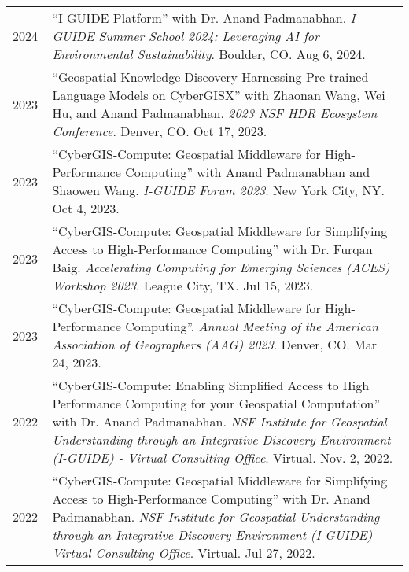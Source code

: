\documentclass{acmcv}
\begin{document}
    \begin{longtable}{p{0.1\linewidth} p{0.9\linewidth}}

        2024 & ``I-GUIDE Platform'' with Dr. Anand Padmanabhan. \textit{I-GUIDE Summer School 2024: Leveraging AI for Environmental Sustainability}. Boulder, CO. Aug 6, 2024.\\


        2023 & ``Geospatial Knowledge Discovery Harnessing Pre-trained Language Models on CyberGISX'' with Zhaonan Wang, Wei Hu, and Anand Padmanabhan. \textit{2023 NSF HDR Ecosystem Conference}. Denver, CO. Oct 17, 2023.\\

        2023 & ``CyberGIS-Compute: Geospatial Middleware for High-Performance Computing'' with Anand Padmanabhan and Shaowen Wang. \textit{I-GUIDE Forum 2023}. New York City, NY. Oct 4, 2023.\\

        2023 & ``CyberGIS-Compute: Geospatial Middleware for Simplifying Access to High-Performance Computing'' with Dr. Furqan Baig. \textit{Accelerating Computing for Emerging Sciences (ACES) Workshop 2023}. League City, TX. Jul 15, 2023.\\

        2023 & ``CyberGIS-Compute: Geospatial Middleware for High-Performance Computing''. \textit{Annual Meeting of the American Association of Geographers (AAG) 2023}. Denver, CO. Mar 24, 2023.\\

        2022 & ``CyberGIS-Compute: Enabling Simplified Access to High Performance Computing for your Geospatial Computation'' with Dr. Anand Padmanabhan. \textit{NSF Institute for Geospatial Understanding through an Integrative Discovery Environment (I-GUIDE) - Virtual Consulting Office}. Virtual. Nov. 2, 2022.\\

        2022 & ``CyberGIS-Compute: Geospatial Middleware for Simplifying Access to High-Performance Computing'' with Dr. Anand Padmanabhan. \textit{NSF Institute for Geospatial Understanding through an Integrative Discovery Environment (I-GUIDE) - Virtual Consulting Office}. Virtual. Jul 27, 2022. \\

    \end{longtable}
    \vspace*{-0.2cm}

\end{document}
